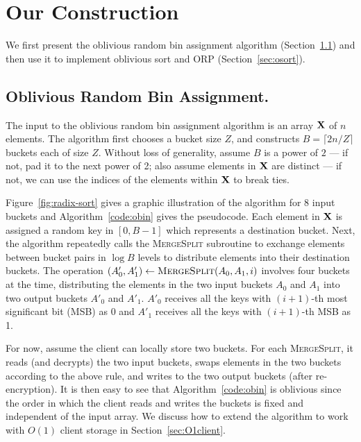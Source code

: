 



\section{Our Construction} 
\label{sec:random-bin-assignment}

We first present the oblivious random bin assignment algorithm (Section~\ref{sec:obin})  and then use it to implement oblivious sort and ORP (Section~\ref{sec:osort}).

\newcommand{\val}{{\sf value}}
\newcommand{\pref}{{\sf pref}}


\subsection{Oblivious Random Bin Assignment.}
\label{sec:obin}


The input to the oblivious random bin assignment algorithm is an array $\mathbf{X}$ of $n$ elements. 
The algorithm first chooses a bucket size $Z$, 
and constructs $B=\lceil 2n/Z \rceil$ buckets each of size $Z$.
Without loss of generality, assume $B$ is a power of $2$ --- if not, pad it to the next power of 2;
also assume elements in $\mathbf{X}$ are distinct --- if not, we can use the indices of the elements within $\mathbf{X}$ to break ties.

Figure~\ref{fig:radix-sort} gives a graphic illustration of the algorithm for 8 input buckets and Algorithm~\ref{code:obin} gives the pseudocode.
Each element in $\mathbf{X}$ is assigned a random key in $[0, B-1]$ which represents a destination bucket.
Next, the algorithm repeatedly calls the \textsc{MergeSplit} subroutine to exchange elements between bucket pairs in $\log B$ levels to distribute elements into their destination buckets. 
The operation $(A'_0,A'_1)\leftarrow \textsc{MergeSplit}(A_0,A_1,i)$ involves four buckets at the time, distributing the elements in the two input buckets $A_0$ and $A_1$ into two output buckets $A'_0$ and $A'_1$.
$A'_0$ receives all the keys with $(i+1)$-th most significant bit (MSB) as 0 and $A'_1$ receives all the keys with $(i+1)$-th MSB as 1.




For now, assume the client can locally store two buckets.
For each \textsc{MergeSplit}, it reads (and decrypts) the two input buckets, swaps elements in the two buckets according to the above rule, and writes to the two output buckets (after re-encryption).
It is then easy to see that Algorithm~\ref{code:obin} is oblivious since the order in which the client reads and writes the buckets is fixed and independent of the input array.
We discuss how to extend the algorithm to work with $O(1)$ client storage in Section~\ref{sec:O1client}. 

